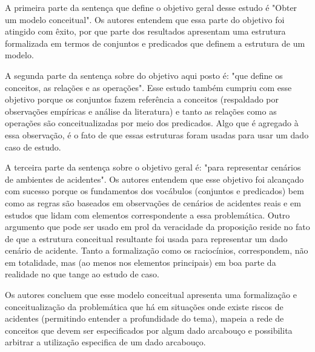 A primeira parte da sentença que define o objetivo geral desse estudo é "Obter um modelo conceitual". Os autores entendem que essa parte do objetivo foi atingido com êxito, por que parte dos resultados apresentam uma estrutura formalizada em termos de conjuntos e predicados que definem a estrutura de um modelo. 

A segunda parte da sentença sobre do objetivo aqui posto é: "que define os conceitos, as relações e as operações". Esse estudo também cumpriu com esse objetivo porque os conjuntos fazem referência a conceitos (respaldado por observações empíricas e análise da literatura) e tanto as relações como as operações são conceitualizadas por meio dos predicados. Algo que é agregado à essa observação, é o fato de que essas estruturas foram usadas para usar um dado caso de estudo.

A terceira parte da sentença sobre o objetivo geral é: "para representar cenários de ambientes de acidentes". Os autores entendem que esse objetivo foi alcançado com sucesso porque os fundamentos dos vocábulos (conjuntos e predicados) bem como as regras são baseados em observações de cenários de acidentes reais e  em estudos que lidam com elementos correspondente a essa problemática. Outro argumento que pode ser usado em prol da veracidade da proposição reside no fato de que a estrutura conceitual resultante foi usada para representar um dado cenário de acidente. Tanto a formalização como os raciocínios, correspondem, não em totalidade, mas (ao menos nos elementos principais) em boa parte da realidade no que tange ao estudo de caso. 

Os autores concluem que esse modelo conceitual apresenta uma formalização e conceitualização da problemática que há em situações onde existe riscos de acidentes (permitindo entender a profundidade do tema), mapeia a rede de conceitos que devem ser especificados por algum dado arcabouço e possibilita arbitrar a utilização especifica de um dado arcabouço.